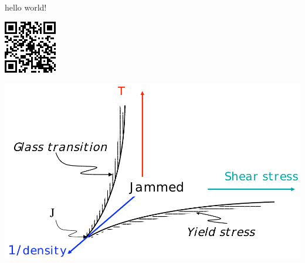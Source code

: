 \documentclass{article}
\begin{document}
hello world! 

\includegraphics[width=.1\linewidth]{figures/tracking}

\includegraphics[width=\linewidth]{figures/jpd}
\end{document}
